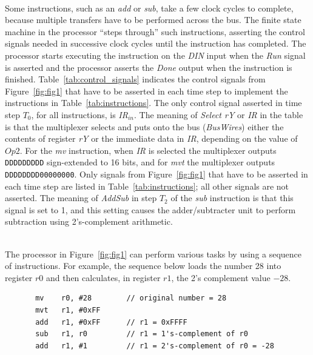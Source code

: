 \documentclass[epsfig,10pt,fullpage]{article} \addtolength{\textwidth}{1.5in}
\begin{document}
~\\
Some instructions, such as an {\it add} or {\it sub}, take a few clock cycles to complete, 
because multiple transfers have to be performed across the bus. The finite state machine in the 
processor ``steps through'' such instructions, asserting the control signals needed in 
successive clock cycles until the instruction has completed.  The processor starts executing 
the instruction on the {\it DIN} input when the {\it Run} signal is asserted and the processor 
asserts the {\it Done} output when the instruction is finished.  Table~\ref{tab:control_signals}
indicates the control signals from Figure~\ref{fig:fig1} that have to be 
asserted in each time step to implement the instructions in Table~\ref{tab:instructions}.  The 
only control signal asserted in time step $T_0$, for all instructions, is {\it IR}$_{in}$. 
The meaning of {\it Select rY} or {\it IR} in the table is that the multiplexer selects 
and puts onto the bus ({\it BusWires}) either the contents of register {\it rY} or the immediate 
data in {\it IR}, depending on the value of $Op2$.
For the {\it mv} instruction, when {\it IR} is selected the multiplexer outputs 
\texttt{DDDDDDDDD} sign-extended to 16 bits,
and for {\it mvt} the multiplexer outputs \texttt{DDDDDDDD00000000}.
Only signals from Figure~\ref{fig:fig1} that have to be asserted in each time 
step are listed in Table~\ref{tab:instructions}; all other signals are not asserted. The 
meaning of {\it AddSub} in step $T_2$ of the {\it sub} instruction is that this signal is set 
to 1, and this setting causes the adder/subtracter unit to perform subtraction using 
2's-complement arithmetic.

~\\
The processor in Figure~\ref{fig:fig1} can perform various tasks by using a sequence of 
instructions. For example, the sequence below loads the number 28 into register $r0$ and then 
calculates, in register $r1$, the 2's complement value $-28$.

\begin{minipage}[t]{15 cm}
\begin{lstlisting}
       mv    r0, #28        // original number = 28
       mvt   r1, #0xFF
       add   r1, #0xFF      // r1 = 0xFFFF
       sub   r1, r0         // r1 = 1's-complement of r0
       add   r1, #1         // r1 = 2's-complement of r0 = -28
\end{lstlisting}
\end{minipage}
\end{document}

